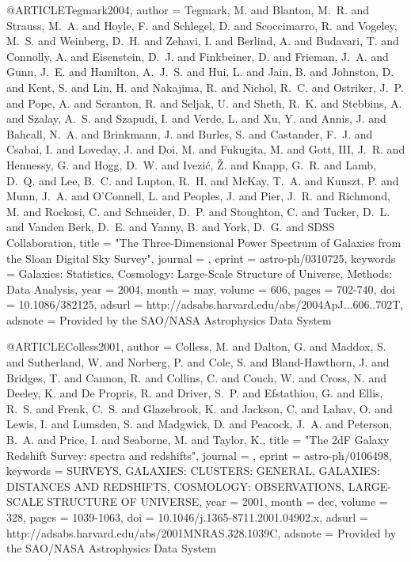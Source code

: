 \documentclass{aa}
\begin{document}
{{{{{{{{{{{{{@ARTICLE{Tegmark2004,
   author = {{Tegmark}, M. and {Blanton}, M.~R. and {Strauss}, M.~A. and 
	{Hoyle}, F. and {Schlegel}, D. and {Scoccimarro}, R. and {Vogeley}, M.~S. and 
	{Weinberg}, D.~H. and {Zehavi}, I. and {Berlind}, A. and {Budavari}, T. and 
	{Connolly}, A. and {Eisenstein}, D.~J. and {Finkbeiner}, D. and 
	{Frieman}, J.~A. and {Gunn}, J.~E. and {Hamilton}, A.~J.~S. and 
	{Hui}, L. and {Jain}, B. and {Johnston}, D. and {Kent}, S. and 
	{Lin}, H. and {Nakajima}, R. and {Nichol}, R.~C. and {Ostriker}, J.~P. and 
	{Pope}, A. and {Scranton}, R. and {Seljak}, U. and {Sheth}, R.~K. and 
	{Stebbins}, A. and {Szalay}, A.~S. and {Szapudi}, I. and {Verde}, L. and 
	{Xu}, Y. and {Annis}, J. and {Bahcall}, N.~A. and {Brinkmann}, J. and 
	{Burles}, S. and {Castander}, F.~J. and {Csabai}, I. and {Loveday}, J. and 
	{Doi}, M. and {Fukugita}, M. and {Gott}, III, J.~R. and {Hennessy}, G. and 
	{Hogg}, D.~W. and {Ivezi{\'c}}, {\v Z}. and {Knapp}, G.~R. and 
	{Lamb}, D.~Q. and {Lee}, B.~C. and {Lupton}, R.~H. and {McKay}, T.~A. and 
	{Kunszt}, P. and {Munn}, J.~A. and {O'Connell}, L. and {Peoples}, J. and 
	{Pier}, J.~R. and {Richmond}, M. and {Rockosi}, C. and {Schneider}, D.~P. and 
	{Stoughton}, C. and {Tucker}, D.~L. and {Vanden Berk}, D.~E. and 
	{Yanny}, B. and {York}, D.~G. and {SDSS Collaboration}},
    title = "{The Three-Dimensional Power Spectrum of Galaxies from the Sloan Digital Sky Survey}",
  journal = {\apj},
   eprint = {astro-ph/0310725},
 keywords = {Galaxies: Statistics, Cosmology: Large-Scale Structure of Universe, Methods: Data Analysis},
     year = 2004,
    month = may,
   volume = 606,
    pages = {702-740},
      doi = {10.1086/382125},
   adsurl = {http://adsabs.harvard.edu/abs/2004ApJ...606..702T},
  adsnote = {Provided by the SAO/NASA Astrophysics Data System}
}

@ARTICLE{Colless2001,
   author = {{Colless}, M. and {Dalton}, G. and {Maddox}, S. and {Sutherland}, W. and 
	{Norberg}, P. and {Cole}, S. and {Bland-Hawthorn}, J. and {Bridges}, T. and 
	{Cannon}, R. and {Collins}, C. and {Couch}, W. and {Cross}, N. and 
	{Deeley}, K. and {De Propris}, R. and {Driver}, S.~P. and {Efstathiou}, G. and 
	{Ellis}, R.~S. and {Frenk}, C.~S. and {Glazebrook}, K. and {Jackson}, C. and 
	{Lahav}, O. and {Lewis}, I. and {Lumsden}, S. and {Madgwick}, D. and 
	{Peacock}, J.~A. and {Peterson}, B.~A. and {Price}, I. and {Seaborne}, M. and 
	{Taylor}, K.},
    title = "{The 2dF Galaxy Redshift Survey: spectra and redshifts}",
  journal = {\mnras},
   eprint = {astro-ph/0106498},
 keywords = {SURVEYS, GALAXIES: CLUSTERS: GENERAL, GALAXIES: DISTANCES AND REDSHIFTS, COSMOLOGY: OBSERVATIONS, LARGE-SCALE STRUCTURE OF UNIVERSE},
     year = 2001,
    month = dec,
   volume = 328,
    pages = {1039-1063},
      doi = {10.1046/j.1365-8711.2001.04902.x},
   adsurl = {http://adsabs.harvard.edu/abs/2001MNRAS.328.1039C},
  adsnote = {Provided by the SAO/NASA Astrophysics Data System}
}

}}}}}}}}}}}}}
\end{document}
